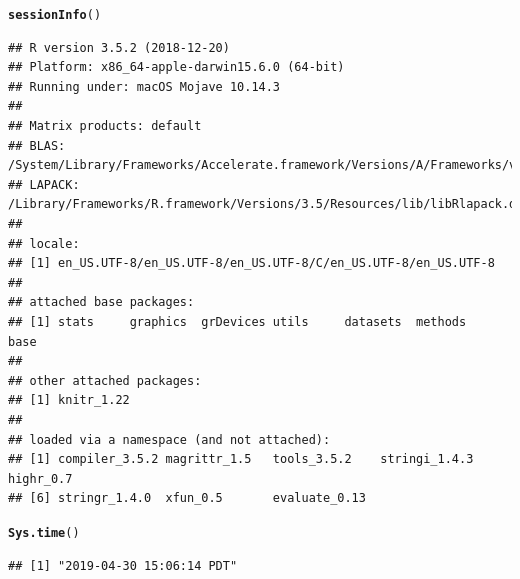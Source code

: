\documentclass{article}\usepackage[]{graphicx}\usepackage[]{color}
\makeatletter
\newcommand{\hlstd}[1]{\textcolor[rgb]{0.345,0.345,0.345}{#1}}%
\newcommand{\hlkwd}[1]{\textcolor[rgb]{0.737,0.353,0.396}{\textbf{#1}}}%
\newenvironment{kframe}{%
 \def\at@end@of@kframe{}%
 \ifinner\ifhmode%
  \def\at@end@of@kframe{\end{minipage}}%
  \begin{minipage}{\columnwidth}%
 \fi\fi%
 \def\FrameCommand##1{\hskip\@totalleftmargin \hskip-\fboxsep
 \colorbox{shadecolor}{##1}\hskip-\fboxsep
     \hskip-\linewidth \hskip-\@totalleftmargin \hskip\columnwidth}%
 \MakeFramed {\advance\hsize-\width
   \@totalleftmargin\z@ \linewidth\hsize
   \@setminipage}}%
 {\par\unskip\endMakeFramed%
 \at@end@of@kframe}
\newenvironment{knitrout}{}{} %
\makeatother
\begin{document}
\begin{knitrout}
\color{fgcolor}\begin{kframe}
\begin{alltt}
\hlkwd{sessionInfo}\hlstd{()}
\end{alltt}
\begin{verbatim}
## R version 3.5.2 (2018-12-20)
## Platform: x86_64-apple-darwin15.6.0 (64-bit)
## Running under: macOS Mojave 10.14.3
## 
## Matrix products: default
## BLAS: /System/Library/Frameworks/Accelerate.framework/Versions/A/Frameworks/vecLib.framework/Versions/A/libBLAS.dylib
## LAPACK: /Library/Frameworks/R.framework/Versions/3.5/Resources/lib/libRlapack.dylib
## 
## locale:
## [1] en_US.UTF-8/en_US.UTF-8/en_US.UTF-8/C/en_US.UTF-8/en_US.UTF-8
## 
## attached base packages:
## [1] stats     graphics  grDevices utils     datasets  methods   base     
## 
## other attached packages:
## [1] knitr_1.22
## 
## loaded via a namespace (and not attached):
## [1] compiler_3.5.2 magrittr_1.5   tools_3.5.2    stringi_1.4.3  highr_0.7     
## [6] stringr_1.4.0  xfun_0.5       evaluate_0.13
\end{verbatim}
\begin{alltt}
\hlkwd{Sys.time}\hlstd{()}
\end{alltt}
\begin{verbatim}
## [1] "2019-04-30 15:06:14 PDT"
\end{verbatim}
\end{kframe}
\end{knitrout}
\end{document}
